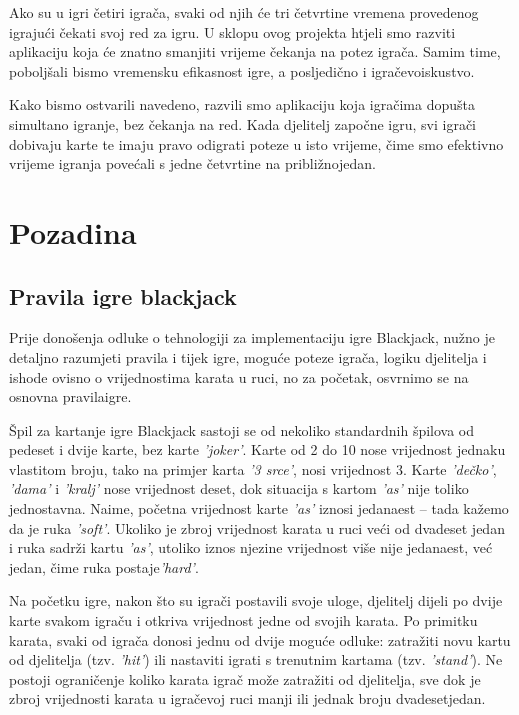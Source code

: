 \documentclass[conference]{IEEEtran}
\begin{document}
Ako su u igri četiri igrača, svaki od njih će tri četvrtine vremena provedenog igrajući čekati svoj red za igru. U sklopu ovog projekta htjeli smo razviti aplikaciju koja će znatno smanjiti vrijeme čekanja na potez igrača. Samim time, poboljšali bismo vremensku efikasnost igre, a posljedično i igračevo\break iskustvo.

Kako bismo ostvarili navedeno, razvili smo aplikaciju koja igračima dopušta simultano igranje, bez čekanja na red. Kada djelitelj započne igru, svi igrači dobivaju karte te imaju pravo odigrati poteze u isto vrijeme, čime smo efektivno vrijeme igranja povećali s jedne četvrtine na približno\break jedan.


\section{Pozadina}

\subsection{Pravila igre blackjack}

Prije donošenja odluke o tehnologiji za implementaciju igre Blackjack, nužno je detaljno razumjeti pravila i tijek igre, moguće poteze igrača, logiku djelitelja i ishode ovisno o vrijednostima karata u ruci, no za početak, osvrnimo se na osnovna pravila\break igre.

Špil za kartanje igre Blackjack sastoji se od nekoliko standardnih špilova od pedeset i dvije karte, bez karte \textit{'joker'}. Karte od 2 do 10 nose vrijednost jednaku vlastitom broju, tako na primjer karta \textit{'3 srce'}, nosi vrijednost 3. Karte \textit{'dečko'}, \textit{'dama'} i \textit{'kralj'} nose vrijednost deset, dok situacija s kartom \textit{'as'} nije toliko jednostavna. Naime, početna vrijednost karte \textit{'as'} iznosi jedanaest – tada kažemo da je ruka \textit{'soft'}. Ukoliko je zbroj vrijednost karata u ruci veći od dvadeset jedan i ruka sadrži kartu \textit{'as'}, utoliko iznos njezine vrijednost više nije jedanaest, već jedan, čime ruka postaje\break \textit{'hard'}.

Na početku igre, nakon što su igrači postavili svoje uloge, djelitelj dijeli po dvije karte svakom igraču i otkriva vrijednost jedne od svojih karata. Po primitku karata, svaki od igrača donosi jednu od dvije moguće odluke: zatražiti novu kartu od djelitelja (tzv. \textit{'hit'}) ili nastaviti igrati s trenutnim kartama (tzv. \textit{'stand'}). Ne postoji ograničenje koliko karata igrač može zatražiti od djelitelja, sve dok je zbroj vrijednosti karata u igračevoj ruci manji ili jednak broju dvadeset\break jedan. 
\end{document}
